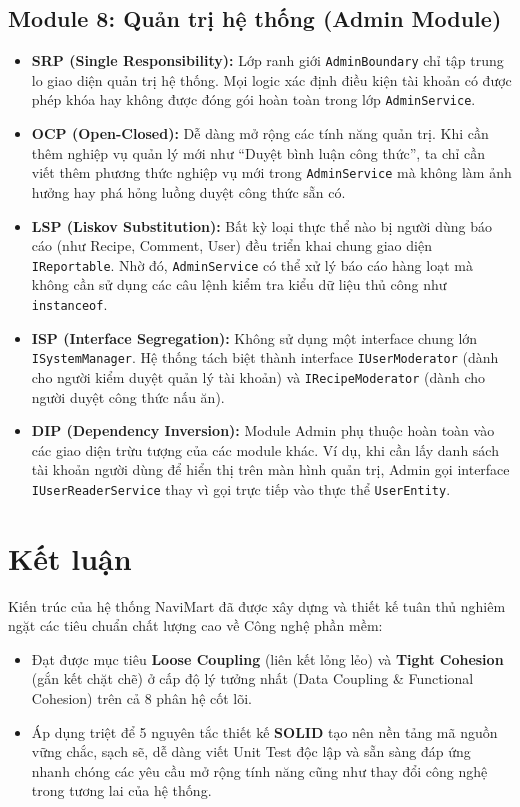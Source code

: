\documentclass[12pt,a4paper]{article}
\begin{document}
\subsection{Module 8: Quản trị hệ thống (Admin Module)}
\begin{itemize}
    \item \textbf{SRP (Single Responsibility):} Lớp ranh giới \texttt{AdminBoundary} chỉ tập trung lo giao diện quản trị hệ thống. Mọi logic xác định điều kiện tài khoản có được phép khóa hay không được đóng gói hoàn toàn trong lớp \texttt{AdminService}.
    \item \textbf{OCP (Open-Closed):} Dễ dàng mở rộng các tính năng quản trị. Khi cần thêm nghiệp vụ quản lý mới như ``Duyệt bình luận công thức'', ta chỉ cần viết thêm phương thức nghiệp vụ mới trong \texttt{AdminService} mà không làm ảnh hưởng hay phá hỏng luồng duyệt công thức sẵn có.
    \item \textbf{LSP (Liskov Substitution):} Bất kỳ loại thực thể nào bị người dùng báo cáo (như Recipe, Comment, User) đều triển khai chung giao diện \texttt{IReportable}. Nhờ đó, \texttt{AdminService} có thể xử lý báo cáo hàng loạt mà không cần sử dụng các câu lệnh kiểm tra kiểu dữ liệu thủ công như \texttt{instanceof}.
    \item \textbf{ISP (Interface Segregation):} Không sử dụng một interface chung lớn \texttt{ISystemManager}. Hệ thống tách biệt thành interface \texttt{IUserModerator} (dành cho người kiểm duyệt quản lý tài khoản) và \texttt{IRecipeModerator} (dành cho người duyệt công thức nấu ăn).
    \item \textbf{DIP (Dependency Inversion):} Module Admin phụ thuộc hoàn toàn vào các giao diện trừu tượng của các module khác. Ví dụ, khi cần lấy danh sách tài khoản người dùng để hiển thị trên màn hình quản trị, Admin gọi interface \texttt{IUserReaderService} thay vì gọi trực tiếp vào thực thể \texttt{UserEntity}.
\end{itemize}

\section{Kết luận}
Kiến trúc của hệ thống NaviMart đã được xây dựng và thiết kế tuân thủ nghiêm ngặt các tiêu chuẩn chất lượng cao về Công nghệ phần mềm:
\begin{itemize}
    \item Đạt được mục tiêu \textbf{Loose Coupling} (liên kết lỏng lẻo) và \textbf{Tight Cohesion} (gắn kết chặt chẽ) ở cấp độ lý tưởng nhất (Data Coupling \& Functional Cohesion) trên cả 8 phân hệ cốt lõi.
    \item Áp dụng triệt để 5 nguyên tắc thiết kế \textbf{SOLID} tạo nên nền tảng mã nguồn vững chắc, sạch sẽ, dễ dàng viết Unit Test độc lập và sẵn sàng đáp ứng nhanh chóng các yêu cầu mở rộng tính năng cũng như thay đổi công nghệ trong tương lai của hệ thống.
\end{itemize}
\end{document}
